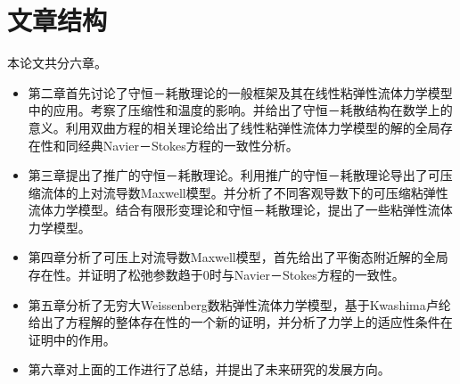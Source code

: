 \documentclass{article}
\begin{document}
\section{文章结构}
本论文共分六章。
\begin{itemize}
\item 第二章首先讨论了守恒－耗散理论的一般框架及其在线性粘弹性流体力学模型中的应用。考察了压缩性和温度的影响。并给出了守恒－耗散结构在数学上的意义。利用双曲方程的相关理论给出了线性粘弹性流体力学模型的解的全局存在性和同经典Navier－Stokes方程的一致性分析。
\item 第三章提出了推广的守恒－耗散理论。利用推广的守恒－耗散理论导出了可压缩流体的上对流导数Maxwell模型。并分析了不同客观导数下的可压缩粘弹性流体力学模型。结合有限形变理论和守恒－耗散理论，提出了一些粘弹性流体力学模型。
\item 第四章分析了可压上对流导数Maxwell模型，首先给出了平衡态附近解的全局存在性。并证明了松弛参数趋于0时与Navier－Stokes方程的一致性。
\item 第五章分析了无穷大Weissenberg数粘弹性流体力学模型，基于Kwashima卢纶给出了方程解的整体存在性的一个新的证明，并分析了力学上的适应性条件在证明中的作用。
\item 第六章对上面的工作进行了总结，并提出了未来研究的发展方向。
\end{itemize}





	
	

 
\end{document}
